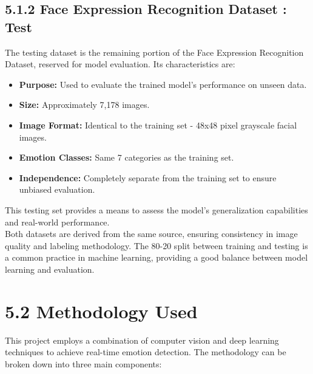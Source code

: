 \documentclass[12pt]{report}
\begin{document}
\subsection*{5.1.2 Face Expression Recognition Dataset : Test}
\begin{center}
    \justify
The testing dataset is the remaining portion of the Face Expression Recognition Dataset, reserved for model evaluation. Its characteristics are:
\begin{itemize}
    \item \textbf{Purpose:} Used to evaluate the trained model's performance on unseen data.
    \item \textbf{Size:} Approximately 7,178 images.
    \item \textbf{Image Format:} Identical to the training set - 48x48 pixel grayscale facial images.
    \item \textbf{Emotion Classes:} Same 7 categories as the training set.
    \item \textbf{Independence:} Completely separate from the training set to ensure unbiased evaluation.
\end{itemize}
This testing set provides a means to assess the model's generalization capabilities and real-world performance.\\
Both datasets are derived from the same source, ensuring consistency in image quality and labeling methodology. The 80-20 split between training and testing is a common practice in machine learning, providing a good balance between model learning and evaluation.
\end{center}
\vspace{1em}
\section*{5.2 Methodology Used}
\begin{center}
    \justify
This project employs a combination of computer vision and deep learning techniques to achieve real-time emotion detection. The methodology can be broken down into three main components:
\end{center}
\vspace{0.5em}
\end{document}
